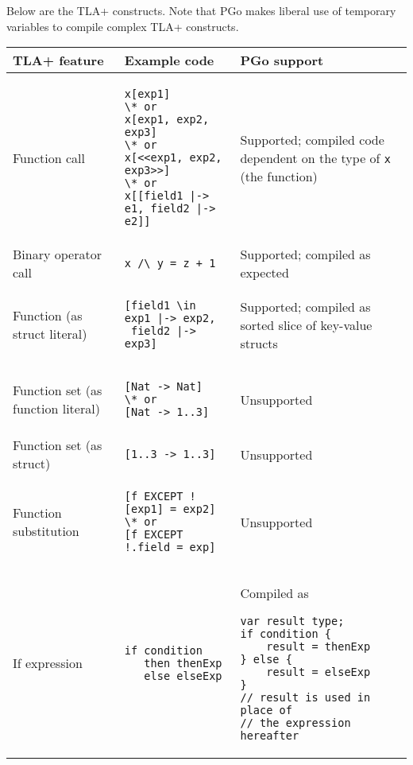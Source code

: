 Below are the TLA+ constructs. Note that PGo makes liberal use of temporary variables to compile complex TLA+ constructs.

\begin{center}
\lstset{style=tabularstyle}
\renewcommand{\arraystretch}{1.5}
\begin{longtable}{ || m{} | m{} | m{} || }
	\hline
	\textbf{TLA+ feature} & \textbf{Example code} & \textbf{PGo support} \\
	\hline\hline
	Function call &
	\begin{lstlisting}[language=pcal]
x[exp1]
\* or
x[exp1, exp2, exp3]
\* or
x[<<exp1, exp2, exp3>>]
\* or
x[[field1 |-> e1, field2 |-> e2]]
	\end{lstlisting} &
	Supported; compiled code dependent on the type of \lstinline[language=pcal]|x| (the function) \\
	\hline
	Binary operator call & \lstinline[language=pcal]|x /\ y = z + 1| & Supported; compiled as expected \\
	\hline
	Function (as struct literal) &
	\begin{lstlisting}[language=pcal]
[field1 \in exp1 |-> exp2,
 field2 |-> exp3]
	\end{lstlisting} &
	Supported; compiled as sorted slice of key-value structs \\
	\hline
	Function set (as function literal) &
	\begin{lstlisting}[language=pcal]
[Nat -> Nat]
\* or
[Nat -> 1..3]
	\end{lstlisting} &
	Unsupported \\
	\hline
	Function set (as struct) & \lstinline[language=pcal]|[1..3 -> 1..3]| & Unsupported \\
	\hline
	Function substitution &
	\begin{lstlisting}[language=pcal]
[f EXCEPT ![exp1] = exp2]
\* or
[f EXCEPT !.field = exp]
	\end{lstlisting} &
	Unsupported \\
	\hline
	If expression &
	\begin{lstlisting}[language=pcal]
if condition
   then thenExp
   else elseExp
	\end{lstlisting} &
	Compiled as
	\begin{lstlisting}[language=golang]
var result type;
if condition {
	result = thenExp
} else {
	result = elseExp
}
// result is used in place of
// the expression hereafter
	\end{lstlisting} \\

\end{longtable}
\end{center}
